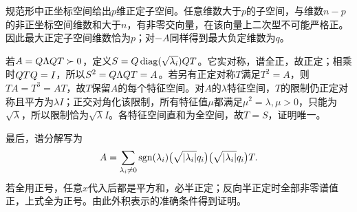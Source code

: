\label{der:6-4}
规范形中正坐标空间给出$p$维正定子空间。任意维数大于$p$的子空间，与维数$n-p$的非正坐标空间维数和大于$n$，有非零交向量，在该向量上二次型不可能严格正。因此最大正定子空间维数恰为$p$；对$-A$同样得到最大负定维数为$q$。

若$A=Q\Lambda QT\succ0$，定义$S=Q\operatorname{diag}(\sqrt{\lambda_i})QT$。它实对称，谱全正，故正定；相乘时$QT Q=I$，所以$S^2=Q\Lambda QT=A$。若另有正定对称$T$满足$T^2=A$，则$TA=T^3=AT$，故$T$保留$A$的每个特征空间。对$A$的$\lambda$特征空间，$T$的限制仍正定对称且平方为$\lambda I$；正交对角化该限制，所有特征值$\mu$都满足$\mu^2=\lambda,\mu>0$，只能为$\sqrt\lambda$，所以限制恰为$\sqrt\lambda I$。各特征空间直和为全空间，故$T=S$，证明唯一。

最后，谱分解写为
\[A=\sum_{\lambda_i\ne0}\operatorname{sgn}(\lambda_i)\bigl(\sqrt{|\lambda_i|}q_i\bigr)\bigl(\sqrt{|\lambda_i|}q_i\bigr)T.\]
若全用正号，任意$x$代入后都是平方和，必半正定；反向半正定时全部非零谱值正，上式全为正号。由此外积表示的准确条件得到证明。
